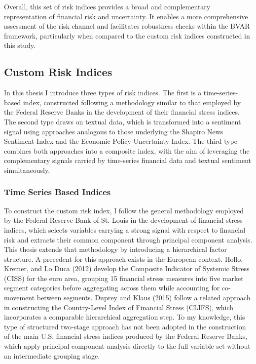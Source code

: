 \documentclass[12pt,a4paper]{report}\usepackage[a4paper, top=2.5cm, bottom=2.5cm, left=2.5cm, right=2.5cm]{geometry}
\begin{document}
Overall, this set of risk indices provides a broad and complementary representation of 
financial risk and uncertainty. It enables a more comprehensive assessment of the risk 
channel and facilitates robustness checks within the BVAR framework, particularly when 
compared to the custom risk indices constructed in this study.

\subsection{Custom Risk Indices}
In this thesis I introduce three types of risk indices. The first is a time-series-based index, constructed following a methodology similar to that employed by the Federal Reserve Banks in the development of their financial stress indices. The second type draws on textual data, which is transformed into a sentiment signal using approaches analogous to those underlying the Shapiro News Sentiment Index and the Economic Policy Uncertainty Index. The third type combines both approaches into a composite index, with the aim of leveraging the complementary signals carried by time-series financial data and textual sentiment simultaneously.

\subsubsection{Time Series Based Indices}
To construct the custom risk index, I follow the general methodology employed by the Federal Reserve Bank of St. Louis in the development of financial stress indices, which selects variables carrying a strong signal with respect to financial risk and extracts their common component through principal component analysis.
This thesis extends that methodology by introducing a hierarchical factor structure. A precedent for this approach exists in the European context. Hollo, Kremer, and Lo Duca (2012) develop the Composite Indicator of Systemic Stress (CISS) for the euro area, grouping 15 financial stress measures into five market segment categories before aggregating across them while accounting for co-movement between segments. Duprey and Klaus (2015) follow a related approach in constructing the Country-Level Index of Financial Stress (CLIFS), which incorporates a comparable hierarchical aggregation step. To my knowledge, this type of structured two-stage approach has not been adopted in the construction of the main U.S. financial stress indices produced by the Federal Reserve Banks, which apply principal component analysis directly to the full variable set without an intermediate grouping stage.
\end{document}
